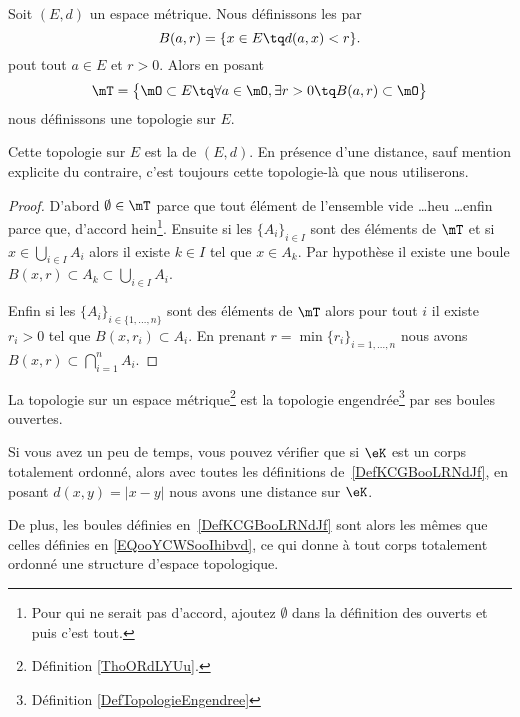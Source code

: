 \begin{theoremDef}     \label{ThoORdLYUu}
	Soit \( (E,d)\) un espace métrique. Nous définissons les  par
	\begin{equation}        \label{EQooYCWSooIhibvd}
		B(a,r)=\{ x\in E\tq d(a,x)<r \}.
	\end{equation}
	pout tout \( a\in E\) et \( r>0\).
	Alors en posant
	\begin{equation}        \label{EqGDVVooDZfwSf}
		\mT=\big\{  \mO\subset E  \tq\forall a\in \mO,\exists r>0\tq B(a,r)\subset \mO \big\}
	\end{equation}
	nous définissons une topologie sur \( E\).

	Cette topologie sur \( E\) est la  de \( (E,d)\). En présence d'une distance, sauf mention explicite du contraire, c'est toujours cette topologie-là que nous utiliserons.
\end{theoremDef}

\begin{proof}
	D'abord \( \emptyset\in\mT\) parce que tout élément de l'ensemble vide \ldots heu \ldots enfin parce que, d'accord hein\footnote{Pour qui ne serait pas d'accord, ajoutez \( \emptyset\) dans la définition des ouverts et puis c'est tout.}. Ensuite si les \( \{A_i\}_{i\in I}\) sont des éléments de \( \mT\) et si \( x\in\bigcup_{i\in I}A_i\) alors il existe \( k\in I\) tel que \( x\in A_k\). Par hypothèse il existe une boule \( B(x,r)\subset A_k\subset\bigcup_{i\in I}A_i\).

	Enfin si les \( \{A_i\}_{i\in\{ 1,\ldots, n \}}\) sont des éléments de \( \mT\) alors pour tout \( i\) il existe \( r_i>0\) tel que \( B(x,r_i)\subset A_i\). En prenant \( r=\min\{ r_i \}_{i=1,\ldots, n}\) nous avons \( B(x,r)\subset\bigcap_{i=1}^nA_i.\)
\end{proof}

\begin{proposition}     \label{PROPooZXTXooEMLgMn}
	La topologie sur un espace métrique\footnote{Définition \ref{ThoORdLYUu}.} est la topologie engendrée\footnote{Définition \ref{DefTopologieEngendree}} par ses boules ouvertes.
\end{proposition}

\begin{normaltext}      \label{NORMooJBMXooLHfAJK}
	Si vous avez un peu de temps, vous pouvez vérifier que si \( \eK\) est un corps totalement ordonné, alors avec toutes les définitions de~\ref{DefKCGBooLRNdJf}, en posant \( d(x,y)=| x-y |\) nous avons une distance sur \( \eK\).

	De plus, les boules définies en~\ref{DefKCGBooLRNdJf} sont alors les mêmes que celles définies en \eqref{EQooYCWSooIhibvd}, ce qui donne à tout corps totalement ordonné une structure d'espace topologique.
\end{normaltext}


